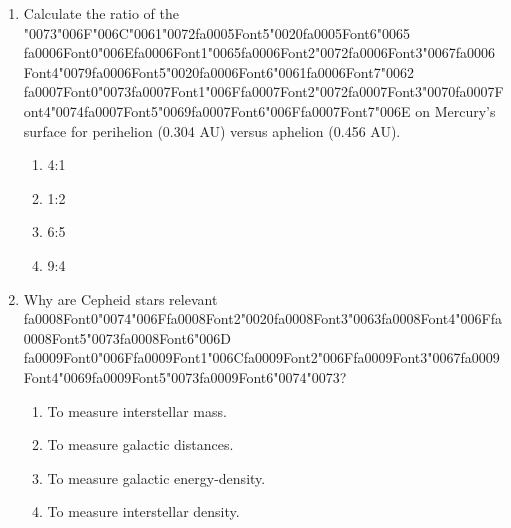 \documentclass[12pt]{article}
\begin{document}
\begin{enumerate}[label=\arabic*.]
\begin{enumerate}[label=(\alph*)]
    \item 6000 K
    \item 7000 K
    \item 9000 K
    \item 13000 K
\end{enumerate}
\item Calculate the ratio of the {\char"0073}{\char"006F}{\char"006C}{\char"0061}{\char"0072}{\csname fa0005Font5\endcsname\char"0020}{\csname fa0005Font6\endcsname\char"0065} {\csname fa0006Font0\endcsname\char"006E}{\csname fa0006Font1\endcsname\char"0065}{\csname fa0006Font2\endcsname\char"0072}{\csname fa0006Font3\endcsname\char"0067}{\csname fa0006Font4\endcsname\char"0079}{\csname fa0006Font5\endcsname\char"0020}{\csname fa0006Font6\endcsname\char"0061}{\csname fa0006Font7\endcsname\char"0062} {\csname fa0007Font0\endcsname\char"0073}{\csname fa0007Font1\endcsname\char"006F}{\csname fa0007Font2\endcsname\char"0072}{\csname fa0007Font3\endcsname\char"0070}{\csname fa0007Font4\endcsname\char"0074}{\csname fa0007Font5\endcsname\char"0069}{\csname fa0007Font6\endcsname\char"006F}{\csname fa0007Font7\endcsname\char"006E} on Mercury's surface for perihelion (0.304
AU) versus aphelion (0.456 AU).
\begin{enumerate}[label=(\alph*)]
    \item 4:1
    \item 1:2
    \item 6:5
    \item 9:4
\end{enumerate}
\item Why are Cepheid stars relevant {\csname fa0008Font0\endcsname\char"0074}{\char"006F}{\csname fa0008Font2\endcsname\char"0020}{\csname fa0008Font3\endcsname\char"0063}{\csname fa0008Font4\endcsname\char"006F}{\csname fa0008Font5\endcsname\char"0073}{\csname fa0008Font6\endcsname\char"006D} {\csname fa0009Font0\endcsname\char"006F}{\csname fa0009Font1\endcsname\char"006C}{\csname fa0009Font2\endcsname\char"006F}{\csname fa0009Font3\endcsname\char"0067}{\csname fa0009Font4\endcsname\char"0069}{\csname fa0009Font5\endcsname\char"0073}{\csname fa0009Font6\endcsname\char"0074}{\char"0073}?
\begin{enumerate}[label=(\alph*)]
    \item To measure interstellar mass.
    \item To measure galactic distances.
    \item To measure galactic energy-density.
    \item To measure interstellar density.
\end{enumerate}
\end{enumerate}
\end{document}
